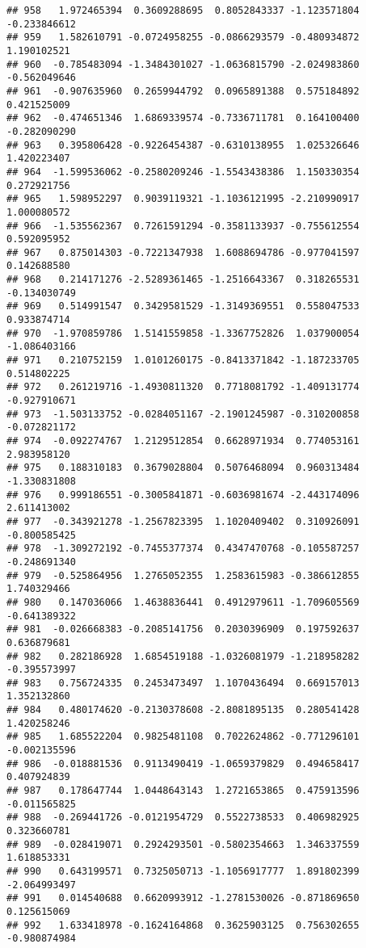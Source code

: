\documentclass[
]{article}
\begin{document}
\begin{verbatim}
## 958   1.972465394  0.3609288695  0.8052843337 -1.123571804 -0.233846612
## 959   1.582610791 -0.0724958255 -0.0866293579 -0.480934872  1.190102521
## 960  -0.785483094 -1.3484301027 -1.0636815790 -2.024983860 -0.562049646
## 961  -0.907635960  0.2659944792  0.0965891388  0.575184892  0.421525009
## 962  -0.474651346  1.6869339574 -0.7336711781  0.164100400 -0.282090290
## 963   0.395806428 -0.9226454387 -0.6310138955  1.025326646  1.420223407
## 964  -1.599536062 -0.2580209246 -1.5543438386  1.150330354  0.272921756
## 965   1.598952297  0.9039119321 -1.1036121995 -2.210990917  1.000080572
## 966  -1.535562367  0.7261591294 -0.3581133937 -0.755612554  0.592095952
## 967   0.875014303 -0.7221347938  1.6088694786 -0.977041597  0.142688580
## 968   0.214171276 -2.5289361465 -1.2516643367  0.318265531 -0.134030749
## 969   0.514991547  0.3429581529 -1.3149369551  0.558047533  0.933874714
## 970  -1.970859786  1.5141559858 -1.3367752826  1.037900054 -1.086403166
## 971   0.210752159  1.0101260175 -0.8413371842 -1.187233705  0.514802225
## 972   0.261219716 -1.4930811320  0.7718081792 -1.409131774 -0.927910671
## 973  -1.503133752 -0.0284051167 -2.1901245987 -0.310200858 -0.072821172
## 974  -0.092274767  1.2129512854  0.6628971934  0.774053161  2.983958120
## 975   0.188310183  0.3679028804  0.5076468094  0.960313484 -1.330831808
## 976   0.999186551 -0.3005841871 -0.6036981674 -2.443174096  2.611413002
## 977  -0.343921278 -1.2567823395  1.1020409402  0.310926091 -0.800585425
## 978  -1.309272192 -0.7455377374  0.4347470768 -0.105587257 -0.248691340
## 979  -0.525864956  1.2765052355  1.2583615983 -0.386612855  1.740329466
## 980   0.147036066  1.4638836441  0.4912979611 -1.709605569 -0.641389322
## 981  -0.026668383 -0.2085141756  0.2030396909  0.197592637  0.636879681
## 982   0.282186928  1.6854519188 -1.0326081979 -1.218958282 -0.395573997
## 983   0.756724335  0.2453473497  1.1070436494  0.669157013  1.352132860
## 984   0.480174620 -0.2130378608 -2.8081895135  0.280541428  1.420258246
## 985   1.685522204  0.9825481108  0.7022624862 -0.771296101 -0.002135596
## 986  -0.018881536  0.9113490419 -1.0659379829  0.494658417  0.407924839
## 987   0.178647744  1.0448643143  1.2721653865  0.475913596 -0.011565825
## 988  -0.269441726 -0.0121954729  0.5522738533  0.406982925  0.323660781
## 989  -0.028419071  0.2924293501 -0.5802354663  1.346337559  1.618853331
## 990   0.643199571  0.7325050713 -1.1056917777  1.891802399 -2.064993497
## 991   0.014540688  0.6620993912 -1.2781530026 -0.871869650  0.125615069
## 992   1.633418978 -0.1624164868  0.3625903125  0.756302655 -0.980874984

\end{verbatim}
\end{document}
